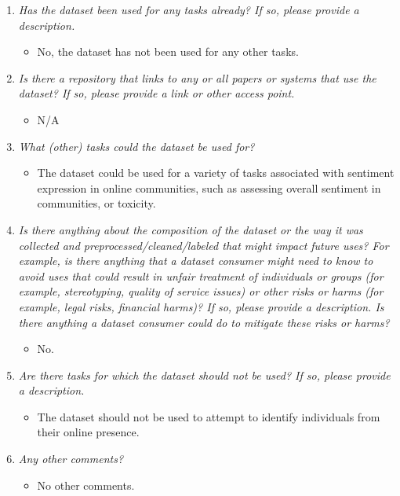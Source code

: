 \documentclass[
]{article}
\providecommand{\tightlist}{%
  \setlength{\itemsep}{0pt}\setlength{\parskip}{0pt}}
\begin{document}
\begin{enumerate}
\def\labelenumi{\arabic{enumi}.}
\tightlist
\item
  \emph{Has the dataset been used for any tasks already? If so, please provide a description.}

  \begin{itemize}
  \tightlist
  \item
    No, the dataset has not been used for any other tasks.
  \end{itemize}
\item
  \emph{Is there a repository that links to any or all papers or systems that use the dataset? If so, please provide a link or other access point.}

  \begin{itemize}
  \tightlist
  \item
    N/A
  \end{itemize}
\item
  \emph{What (other) tasks could the dataset be used for?}

  \begin{itemize}
  \tightlist
  \item
    The dataset could be used for a variety of tasks associated with sentiment expression in online communities, such as assessing overall sentiment in communities, or toxicity.
  \end{itemize}
\item
  \emph{Is there anything about the composition of the dataset or the way it was collected and preprocessed/cleaned/labeled that might impact future uses? For example, is there anything that a dataset consumer might need to know to avoid uses that could result in unfair treatment of individuals or groups (for example, stereotyping, quality of service issues) or other risks or harms (for example, legal risks, financial harms)? If so, please provide a description. Is there anything a dataset consumer could do to mitigate these risks or harms?}

  \begin{itemize}
  \tightlist
  \item
    No.
  \end{itemize}
\item
  \emph{Are there tasks for which the dataset should not be used? If so, please provide a description.}

  \begin{itemize}
  \tightlist
  \item
    The dataset should not be used to attempt to identify individuals from their online presence.
  \end{itemize}
\item
  \emph{Any other comments?}

  \begin{itemize}
  \tightlist
  \item
    No other comments.
  \end{itemize}
\end{enumerate}
\end{document}
